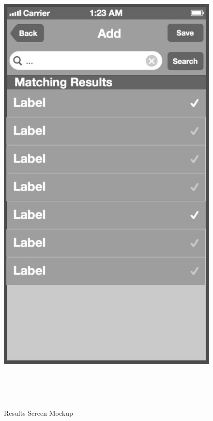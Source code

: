 \begin{figure}[!b]
\begin{minipage}[b]{0.45\linewidth}
        \includegraphics[width=0.8025\linewidth]{figures/Screen_3_bw.jpg}
        \caption[List Screen to add to Comparison List Mockup]{Results Screen Mockup}
        \label{fig:AlternativeListScreen}
    \end{minipage}
    \\
    \\
    \\
    \begin{minipage}[b]{0.45\linewidth}
        \centering

\end{minipage}
\end{figure}
